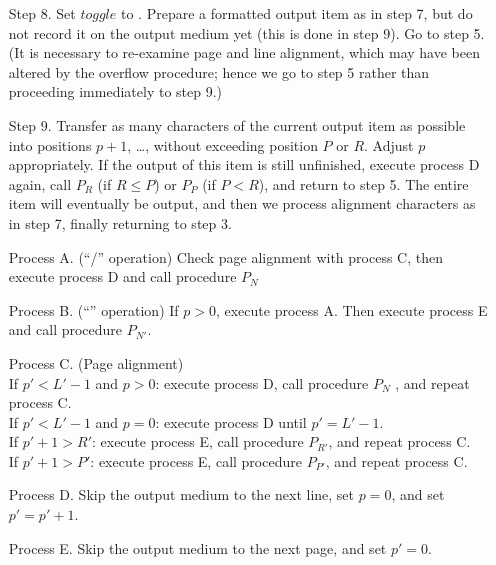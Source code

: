 \documentclass[a4paper,11pt]{article}
\begin{document}
\begin{enumerate}
    \item[Step 8.] Set $toggle$ to . Prepare a formatted
      output item as in step 7, but do not record it on the output
      medium yet (this is done in step 9).  Go to step 5.  (It is
      necessary to re-examine page and line alignment, which may have
      been altered by the overflow procedure; hence we go to step 5
      rather than proceeding immediately to step 9.)

    \item[Step 9.] Transfer as many characters of the current output
      item as possible into positions $p+1$, \dots, without exceeding
      position $P$ or $R$.  Adjust $p$ appropriately.  If the output
      of this item is still unfinished, execute process D again, call
      $P_R$ (if $R \leq P$) or $P_P$ (if $P < R$), and return to step
      5.  The entire item will eventually be output, and then we
      process alignment characters as in step 7, finally returning to
      step 3.
\end{enumerate}


\begin{enumerate}
    \item[Process A.] (``/'' operation) Check page alignment with
      process C, then execute process D and call procedure $P_N$

    \item[Process B.] (``\mpow{}'' operation) If $p > 0$, execute
      process A.  Then execute process E and call procedure $P_{N'}$.

    \item[Process C.] (Page alignment)\\
      If $p'<L'-1$ and $p > 0$: execute process D, call procedure
      $P_N$ , and repeat process C.\\
      If $p'<L'-1$ and $p = 0$: execute process D until $p' = L'-1$.\\
      If $p'+1>R'$: execute process E, call procedure $P_{R'}$, and
      repeat process C.\\
      If $p'+1>P'$: execute process E, call procedure $P_{P'}$, and
      repeat process C.

    \item[Process D.] Skip the output medium to the next line, set
      $p=0$, and set $p'=p'+1$.

    \item[Process E.] Skip the output medium to the next page, and set
      $p'=0$.
\end{enumerate}
\end{document}
